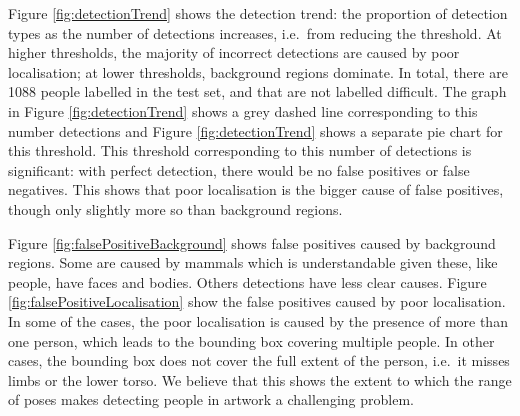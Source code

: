 \documentclass[runningheads]{llncs}
\begin{document}
Figure \ref{fig:detectionTrend} shows the detection trend: the proportion of detection types as the number of detections increases, i.e.\ from reducing the threshold.
At higher thresholds, the majority of incorrect detections are caused by poor localisation; at lower thresholds, background regions dominate.
In total, there are 1088 people labelled in the test set, and that are not labelled difficult.
The graph in Figure \ref{fig:detectionTrend} shows a grey dashed line corresponding to this number detections and Figure \ref{fig:detectionTrend} shows a separate pie chart for this threshold.
This threshold corresponding to this number of detections is significant: with perfect detection, there would be no false positives or false negatives.
This shows that poor localisation is the bigger cause of false positives, though only slightly more so than background regions.

Figure \ref{fig:falsePositiveBackground} shows false positives caused by background regions.
Some are caused by mammals which is understandable given these, like people, have faces and bodies.
Others detections have less clear causes.
Figure \ref{fig:falsePositiveLocalisation} show the false positives caused by poor localisation.
In some of the cases, the poor localisation is caused by the presence of more than one person, which leads to the bounding box covering multiple people.
In other cases, the bounding box does not cover the full extent of the person, i.e.\ it misses limbs or the lower torso.
We believe that this shows the extent to which the range of poses makes detecting people in \ac{artwork} a challenging problem.
 
\end{document}
